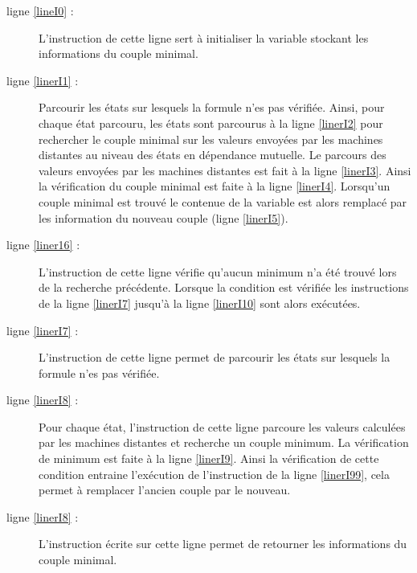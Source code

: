 \begin{description}
	\item[ligne \ref{lineI0} :] L'instruction de cette ligne sert à initialiser la variable stockant les informations du couple minimal.
	\item[ligne \ref{linerI1} :] Parcourir les états \s{\border{}} sur lesquels la formule n'es pas vérifiée. Ainsi, pour chaque état parcouru, les états \s{\notifier} sont parcourus à la ligne \ref{linerI2} pour rechercher le couple minimal sur les valeurs envoyées par les machines distantes au niveau des états en dépendance mutuelle. Le parcours des valeurs envoyées par les machines distantes est fait à la ligne \ref{linerI3}. Ainsi la vérification du couple minimal est faite  à la ligne \ref{linerI4}. Lorsqu'un couple minimal est trouvé le contenue de la variable  est alors remplacé par les information du nouveau couple (ligne \ref{linerI5}).
	\item[ligne \ref{liner16} :]  L'instruction de cette ligne vérifie qu'aucun minimum n'a été trouvé lors de la recherche précédente. Lorsque la condition est vérifiée les instructions de la ligne \ref{linerI7} jusqu'à la ligne \ref{linerI10} sont alors exécutées.
	\item[ligne \ref{linerI7} :] L'instruction de cette ligne permet de parcourir les états \s{\bn{}} sur lesquels la formule n'es pas vérifiée.
	\item[ligne \ref{linerI8} :]  Pour chaque état, l'instruction de cette ligne parcoure les valeurs calculées par les machines distantes et recherche un couple minimum. La vérification de minimum est faite à la ligne \ref{linerI9}. Ainsi la vérification de cette condition entraine l'exécution de l'instruction de la ligne \ref{linerI99}, cela permet à remplacer l'ancien couple par le nouveau.
	\item[ligne \ref{linerI8} :] L'instruction écrite sur cette ligne permet de retourner les informations du couple minimal.
\end{description}
